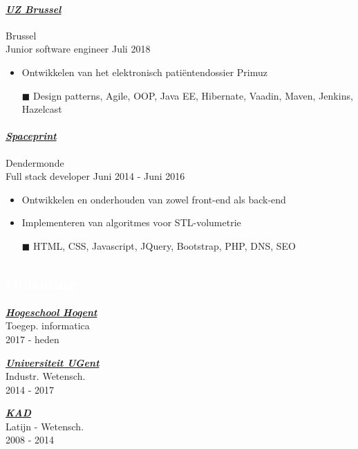 \documentclass[a4paper, twoside]{article}
\begin{document}
\paragraph{\textbf{\textit{\href{https://uzbrussel.be }{\textcolor{blueDark}{ UZ Brussel }}}}} \hfill\small Brussel \\
Junior software engineer \hfill\small
Juli 2018
\begin{itemize}
\itemsep-0.2em
\item Ontwikkelen van het elektronisch patiëntendossier Primuz
\item[\color{orange}$\blacksquare$] Design patterns, Agile, OOP, Java EE, Hibernate, Vaadin, Maven, Jenkins, Hazelcast
\end{itemize}
\paragraph{\textbf{\textit{\href{https:// }{\textcolor{blueDark}{ Spaceprint }}}}} \hfill\small Dendermonde \\
Full stack developer \hfill\small
Juni 2014
- Juni 2016
\begin{itemize}
\itemsep-0.2em
\item Ontwikkelen en onderhouden van zowel front-end als back-end
\item Implementeren van algoritmes voor STL-volumetrie
\item[\color{orange}$\blacksquare$] HTML, CSS, Javascript, JQuery, Bootstrap, PHP, DNS, SEO
\end{itemize}
\begin{mdframed}
\section*{\textcolor{white}{ Opleiding }}
\end{mdframed}
\begin{multicols}{ 3 }
\setlength{\parindent}{0pt}
\par
\textbf{\textit{\href{https://hogent.be }{\textcolor{blueDark}{ Hogeschool Hogent }}}}\\
Toegep. informatica\\ \small 2017 - heden
\setlength{\parindent}{0pt}
\par
\textbf{\textit{\href{https://ugent.be }{\textcolor{blueDark}{ Universiteit UGent }}}}\\
Industr. Wetensch.\\ \small 2014 - 2017
\setlength{\parindent}{0pt}
\par
\textbf{\textit{\href{https://kad.be }{\textcolor{blueDark}{ KAD }}}}\\
Latijn - Wetensch.\\ \small 2008 - 2014
\end{multicols}
\end{document}
